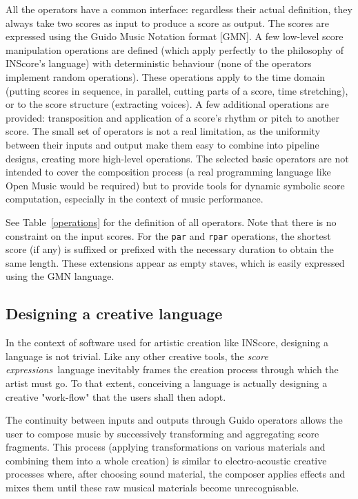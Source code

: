 \documentclass{article}
\newcommand{\OSC}[1]{{\fontsize{9.5pt}{10pt} \selectfont\texttt{#1}}}
\newcommand{\sExpr}{\emph{score expressions}}
\begin{document}
All the operators have a common interface: regardless their actual definition, they always take two scores as input to produce a score as output. The scores are expressed using the Guido Music Notation format [GMN]\cite{hoos98}. A few low-level score manipulation operations are defined (which apply perfectly to the philosophy of INScore's language) with deterministic behaviour (none of the operators implement random operations). These operations apply to the time domain (putting scores in sequence, in parallel, cutting parts of a score, time stretching), or to the score structure (extracting voices). A few additional operations are provided: transposition and application of a score's rhythm or pitch to another score. 
The small set of operators is not a real limitation, as the uniformity between their inputs and output make them easy to combine into pipeline designs, creating more high-level operations. The selected basic operators are not intended to cover the composition process (a real programming language like Open Music \cite{bresson:hal-01182394} would be required) but to provide tools for dynamic symbolic score computation, especially in the context of music performance.

See Table~\ref{operations} for the definition of all operators. 
Note that there is no constraint on the input scores. For the \OSC{par} and \OSC{rpar} operations, the shortest score (if any) is suffixed or prefixed with the necessary duration to obtain the same length. These extensions appear as empty staves, which is easily expressed using the GMN language.

\subsection{Designing a creative language}
In the context of software used for artistic creation like INScore, designing a language is not trivial. Like any other creative tools,  the \sExpr\ language inevitably frames the creation process through which the artist must go. To that extent, conceiving a language is actually designing a creative "work-flow" that the users shall then adopt.

The continuity between inputs and outputs through Guido operators allows the user to compose music by successively transforming and aggregating score fragments. This process (applying transformations on various materials and combining them into a whole creation) is similar to electro-acoustic creative processes where, after choosing sound material, the composer applies effects and mixes them until these raw musical materials become unrecognisable.
\end{document}
